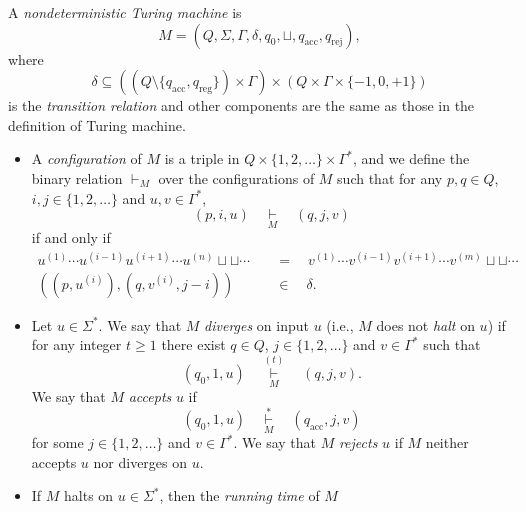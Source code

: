 \begin{definition}
  A \emph{nondeterministic Turing machine} is
  \begin{equation*}
    M = (Q, \Sigma, \Gamma, \delta, q_0, \sqcup, q_\text{acc}, q_\text{rej}),
  \end{equation*}
  where
  \begin{equation*}
    \delta \subseteq ((Q \setminus \{q_\text{acc}, q_\text{reg}\}) \times
    \Gamma) \times (Q \times \Gamma \times \{-1, 0, +1\})
  \end{equation*}
  is the \emph{transition relation} and other components are the same as those
  in the definition of Turing machine.
  \begin{itemize}
    \item A \emph{configuration} of $M$ is a triple in
    $Q \times \{1, 2, \dots\} \times \Gamma^*$, and we define the binary
    relation $\vdash_M$ over the configurations of $M$ such that for any
    $p, q \in Q$, $i, j \in \{1, 2, \dots\}$ and $u, v \in \Gamma^*$,
    \begin{equation*}
      (p, i, u)
      \quad \mathop\vdash\limits_{M} \quad
      (q, j, v)
    \end{equation*}
    if and only if
    \begin{align*}
      u^{(1)} \cdots u^{(i-1)}u^{(i+1)} \cdots u^{(n)} \sqcup \sqcup \cdots
      \quad &= \quad
      v^{(1)} \cdots v^{(i-1)}v^{(i+1)} \cdots v^{(m)} \sqcup \sqcup \cdots \\
      ((p, u^{(i)}), (q, v^{(i)}, j - i)) \quad &\in \quad \delta.
    \end{align*}
    \item Let $u \in \Sigma^*$.
    We say that $M$ \emph{diverges} on input $u$
    (i.e., $M$ does not \emph{halt} on $u$) if for any integer $t \geq 1$ there
    exist $q \in Q$, $j \in \{1, 2, \dots\}$ and $v \in \Gamma^*$ such that
    \begin{equation*}
      (q_0, 1, u)
      \quad \mathop\vdash\limits_{M}^{(t)} \quad
      (q, j, v).
    \end{equation*}
    We say that $M$ \emph{accepts} $u$ if
    \begin{equation*}
      (q_0, 1, u)
      \quad \mathop\vdash\limits_{M}^* \quad
      (q_\text{acc}, j, v)
    \end{equation*}
    for some $j \in \{1, 2, \dots\}$ and $v \in \Gamma^*$.
    We say that $M$ \emph{rejects} $u$ if $M$ neither accepts $u$
    nor diverges on $u$.
    \item If $M$ halts on $u \in \Sigma^*$, then the \emph{running time} of $M$

\end{itemize}
\end{definition}
